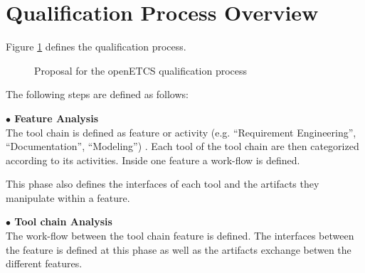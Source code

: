 \section{Qualification Process Overview}
\label{sec:process_overview}
Figure \ref{fig:qualification_process} defines the qualification
process.

\begin{figure}[htbp]
\begin{center}
\end{center}
\caption{Proposal for the openETCS qualification process}
\label{fig:qualification_process}
\end{figure}



The following steps are defined as follows:

{\bf $\bullet$ Feature Analysis}\\
The tool chain is defined as feature or activity (e.g. ``Requirement
Engineering'', ``Documentation'', ``Modeling'') . Each tool of the
tool chain  are then categorized according to its activities. Inside
one feature  a work-flow is defined.

This phase  also defines  the interfaces of each tool and the
artifacts they manipulate within a feature.

{\bf $\bullet$ Tool chain Analysis}\\
The work-flow between the tool chain feature is defined.
The interfaces between the feature is defined at this phase as well as
the artifacts exchange betwen the different features.

